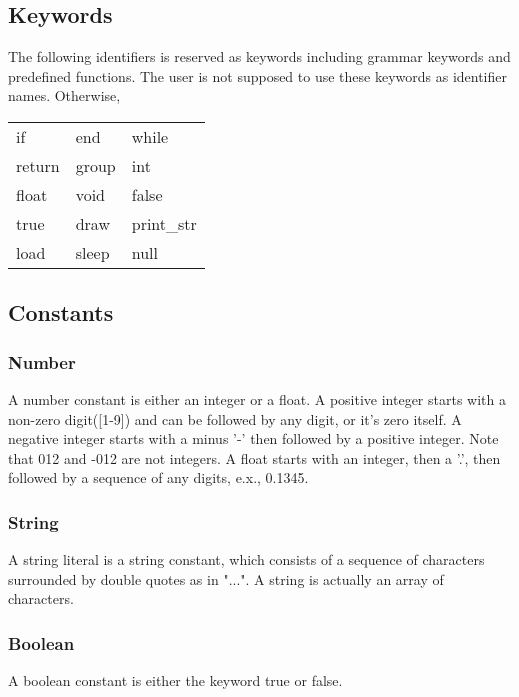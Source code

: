 \documentclass[11pt,letterpaper]{article}
\begin{document}
\subsection {Keywords}
The following identifiers is reserved as keywords including grammar keywords and predefined functions. The user is not supposed to use these keywords as identifier names. Otherwise, 

\begin{center}
    \begin{tabular}{l l l}
		if 		& end 	& while \\
		return	& group	& int 	\\
		float	& void	& false	\\ 
		true		& draw	& print\_str		\\
		load		& sleep	& null			\\
    \end{tabular}
\end{center}

\subsection {Constants}
\subsubsection* {Number}
A number constant is either an integer or a float. A positive integer starts with a non-zero digit([1-9]) and can be followed by any digit, or it's zero itself. A negative integer starts with a minus '-' then followed by a positive integer. Note that 012 and -012 are not integers. A float starts with an integer, then a '.', then followed by a sequence of any digits, e.x., 0.1345.

\subsubsection* {String}
A string literal is a string constant, which consists of a sequence of characters surrounded by double quotes as in "...". A string is actually an array of characters.

\subsubsection* {Boolean}
A boolean constant is either the keyword true or false.
\end{document}
